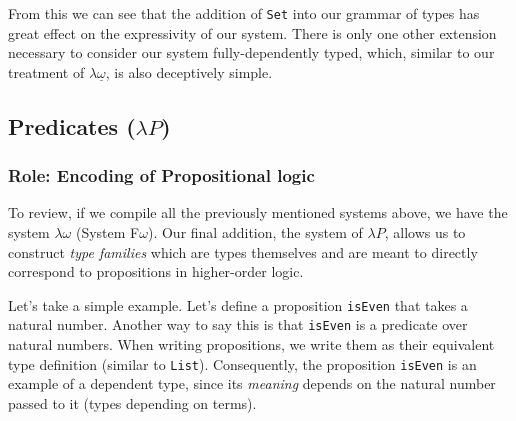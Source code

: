 \documentclass[12pt]{article}
\begin{document}
From this we can see that the addition of {\tt Set} into our grammar of
types has great effect on the expressivity of our system. There is only one
other extension necessary to consider our system fully-dependently typed, which,
similar to our treatment of \(\lambda\underline{\omega}\), is also deceptively
simple.

\subsection*{Predicates (\(\lambda P\))}
\subsubsection*{Role: Encoding of Propositional logic}

To review, if we compile all the previously mentioned systems above, we have
the system \(\lambda\omega\) (System F\(\omega\)). Our final addition, the
system of \(\lambda P\), allows us to construct {\em type families} which are
types themselves and are meant to directly correspond to propositions in
higher-order logic.

Let's take a simple example. Let's define a proposition {\tt isEven} that takes
a natural number. Another way to say this is that {\tt isEven} is a predicate
over natural numbers. When writing propositions, we write them as their equivalent
type definition (similar to {\tt List}). Consequently, the proposition
{\tt isEven} is an example of a dependent type, since its {\em meaning} depends
on the natural number passed to it (types depending on terms).
\end{document}
